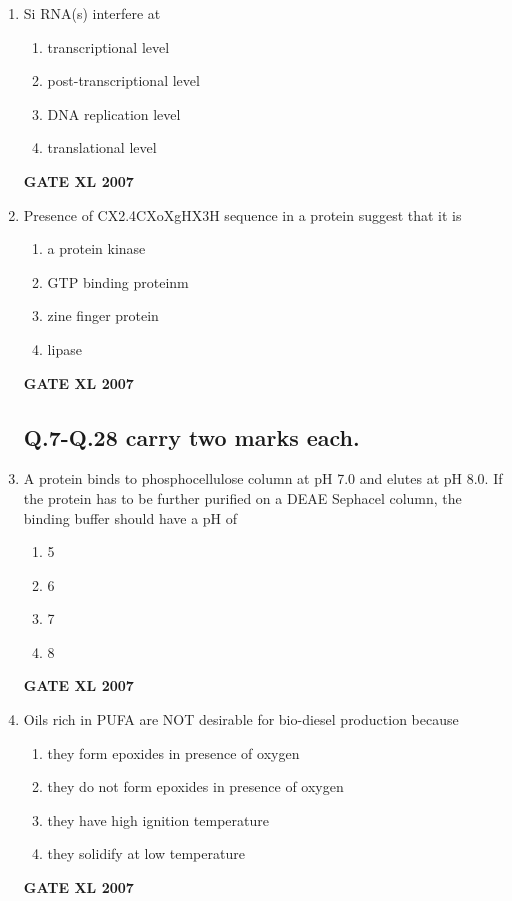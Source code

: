 \documentclass[journal,12pt,onecolumn]{IEEEtran}
\begin{document}
\begin{enumerate}
\begin{multicols}{2}
\begin{enumerate}
	\end{enumerate}
    \end{multicols}
	    \hfill \textbf{GATE XL 2007}

    \item Si RNA(s) interfere at
    \begin{multicols}{2}
        \begin{enumerate} 
            \item transcriptional level 
            \item post-transcriptional level
            \item DNA replication level
            \item translational level
        \end{enumerate}
    \end{multicols}
	    \hfill \textbf{GATE XL 2007}

    \item Presence of CX2.4CXoXgHX3H sequence in a protein suggest that it is
	    \begin{multicols}{2}
        \begin{enumerate} 
            \item a protein kinase 
	    \item GTP binding proteinm
            \item zine finger protein 
            \item lipase
        \end{enumerate}
    \end{multicols}
	    \hfill \textbf{GATE XL 2007}
\subsection*{Q.7-Q.28 carry two marks each.}
    \item A protein binds to phosphocellulose column at pH 7.0 and elutes at pH 8.0. If the protein has to be further purified on a DEAE Sephacel column, the binding buffer should have a pH of
    \begin{enumerate}
        \item 5
        \item 6
        \item 7
        \item 8
    \end{enumerate}

	    \hfill \textbf{GATE XL 2007}
    \item Oils rich in PUFA are NOT desirable for bio-diesel production because
    \begin{enumerate}
        \item they form epoxides in presence of oxygen
        \item they do not form epoxides in presence of oxygen
        \item they have high ignition temperature
        \item they solidify at low temperature
    \end{enumerate}
	    \hfill \textbf{GATE XL 2007}


\end{enumerate}
\end{document}

